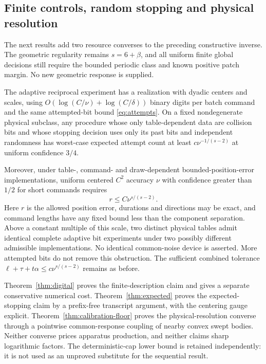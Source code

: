 \subsection{Finite controls, random stopping and physical resolution}
The next results add two resource converses to the preceding constructive
inverse. The geometric regularity remains $s=6+\beta$, and all uniform
finite global decisions still require the bounded periodic class and
known positive patch margin. No new geometric response is supplied.

\begin{theorem}
\label{thm:resources}
The adaptive reciprocal experiment has a realization with dyadic centers
and scales, using $O(\log(C/\nu)+\log(C/\delta))$ binary digits per
batch command and the same attempted-bit bound
\eqref{eq:attempts}. On a fixed nondegenerate physical subclass, any
procedure whose only table-dependent data are collision bits and whose
stopping decision uses only its past bits and independent randomness
has worst-case expected attempt count at least
$c\nu^{-1/(s-2)}$ at uniform confidence $3/4$.

Moreover, under table-, command- and draw-dependent bounded-position-error
implementations, uniform centered $C^2$ accuracy $\nu$ with confidence greater
than $1/2$ for short commands requires
\[
r\le C\nu^{s/(s-2)}.
\]
Here $r$ is the allowed position error, durations and directions may be
exact, and command lengths have any fixed bound less than the component
separation. Above a constant multiple of this scale,
two distinct physical tables admit identical complete adaptive bit
experiments under two possibly different admissible implementations.
No identical common-noise device is asserted. More attempted
bits do not remove this obstruction. The sufficient combined tolerance
$\ell+\tau+t\alpha\le c\nu^{s/(s-2)}$ remains as before.
\end{theorem}

Theorem~\ref{thm:digital} proves the finite-description claim and gives
a separate conservative numerical cost. Theorem~\ref{thm:expected}
proves the expected-stopping claim by a prefix-free transcript argument,
with the centering gauge explicit. Theorem~\ref{thm:calibration-floor}
proves the physical-resolution converse through a pointwise common-response
coupling of nearby convex swept bodies. Neither converse prices
apparatus production, and neither claims sharp logarithmic factors.
The deterministic-cap lower bound is retained independently: it is
not used as an unproved substitute for the sequential result.
